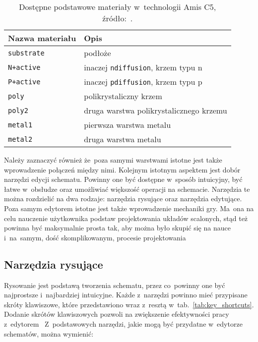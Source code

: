 \newpage
\begin{table}[h]
    \centering
    \caption[Dostępne materiały w~technologii Amis C5.]
    {Dostępne podstawowe materiały w~technologii Amis C5, źródło:~\cite{amis_params}.}
    \label{tab:amis_materials}
    \begin{tabular}{|l|l|}
        \hline
        Nazwa materiału & Opis \\
        \hline
        \hline
        \texttt{substrate} & podłoże \\
        \hline
        \texttt{N+active} & inaczej \texttt{ndiffusion}, krzem typu n\\
        \hline
        \texttt{P+active} & inaczej \texttt{pdiffusion}, krzem typu p\\
        \hline
        \texttt{poly} & polikrystaliczny krzem \\
        \hline
        \texttt{poly2} & druga warstwa polikrystalicznego krzemu \\
        \hline
        \texttt{metal1} & pierwsza warstwa metalu \\
        \hline
        \texttt{metal2} & druga warstwa metalu \\
        \hline
    \end{tabular}
\end{table}

Należy zaznaczyć również że~poza samymi warstwami istotne jest także wprowadzenie połączeń między nimi.
Kolejnym istotnym aspektem jest dobór narzędzi edycji schematu.
Powinny one być dostępne w~sposób intuicyjny, być łatwe w~obsłudze oraz umożliwiać większość operacji na schemacie.
Narzędzia te można rozdzielić na dwa rodzaje: narzędzia rysujące oraz narzędzia edytujące. \\
\indent Poza samym edytorem istotne jest także wprowadzenie mechaniki gry.
Ma~ona na celu nauczenie użytkownika podstaw projektowania układów scalonych,
stąd też powinna być maksymalnie prosta tak, aby można było skupić się na nauce i~na~samym,
dość skomplikowanym, procesie projektowania

\subsection{Narzędzia rysujące}
\label{subsec:narzedzia_rysujace}

Rysowanie jest podstawą tworzenia schematu, przez co~powinny one być najprostsze i~najbardziej intuicyjne.
Każde z~narzędzi powinno mieć przypisane skróty klawiszowe,
które przedstawiono wraz z~resztą w~tab.~\ref{tab:key_shortcuts}. %
Dodanie skrótów klawiszowych pozwoli na zwiększenie efektywności pracy z~edytorem~\cite{shortcuts}
Z~podstawowych narzędzi, jakie mogą być przydatne w~edytorze schematów, można wymienić:

